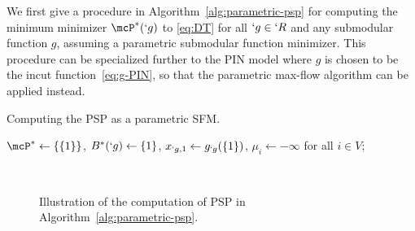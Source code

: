 \documentclass[conference,letterpaper]{IEEEtran}
\begin{document}
We first give a procedure in Algorithm~\ref{alg:parametric-psp}
for computing the minimum minimizer $\mcP^*(`g)$ to \eqref{eq:DT} for all $`g\in `R$ and any
submodular function $g$, assuming a parametric submodular function minimizer. This procedure can be
specialized further to the PIN model where $g$ is chosen to be the incut function~\eqref{eq:g-PIN},
so that the parametric max-flow algorithm can be applied instead. 

\begin{algorithm}[h!]
	\caption{Computing the PSP as a parametric SFM.}
	\label{alg:parametric-psp}
	\DontPrintSemicolon
	\SetAlgoLined
	$\mcP^*\leftarrow \Set{\Set{1}}$,
	$ B^*(`g)\leftarrow \{1\}$, $x_{`g,1}\leftarrow g_{`g}(\{1\})$,
	$\mu_i\leftarrow -\infty$ for all $i \in V$;\label{ln:PSP:init} \;
\end{algorithm}

\begin{figure}[t!]
	\begin{center}
		
		\\
	\end{center}
	\caption{Illustration of the computation of PSP in Algorithm~\ref{alg:parametric-psp}.}
	\label{fig:eg:psp}
\end{figure}
\end{document}
